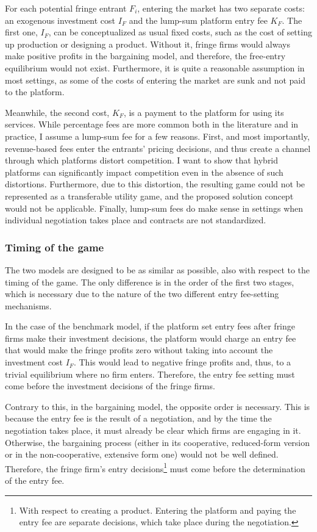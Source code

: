 For each potential fringe entrant $F_i$, entering the market has two separate costs: an exogenous investment cost $I_F$ and the lump-sum platform entry fee $K_F$.
The first one, $I_F$, can be conceptualized as usual fixed costs, such as the cost of setting up production or designing a product.
Without it, fringe firms would always make positive profits in the bargaining model, and therefore, the free-entry equilibrium would not exist.
Furthermore, it is quite a reasonable assumption in most settings, as some of the costs of entering the market are sunk and not paid to the platform.

Meanwhile, the second cost, $K_F$, is a payment to the platform for using its services.
While percentage fees are more common both in the literature and in practice, I assume a lump-sum fee for a few reasons.
First, and most importantly, revenue-based fees enter the entrants' pricing decisions, and thus create a channel through which platforms distort competition.
I want to show that hybrid platforms can significantly impact competition even in the absence of such distortions.
Furthermore, due to this distortion, the resulting game could not be represented as a transferable utility game, and the proposed solution concept would not be applicable.
Finally, lump-sum fees do make sense in settings when individual negotiation takes place and contracts are not standardized.

\subsubsection{Timing of the game}

The two models are designed to be as similar as possible, also with respect to the timing of the game.
The only difference is in the order of the first two stages, which is necessary due to the nature of the two different entry fee-setting mechanisms.

In the case of the benchmark model, if the platform set entry fees after fringe firms make their investment decisions, the platform would charge an entry fee that would make the fringe profits zero without taking into account the investment cost $I_F$.
This would lead to negative fringe profits and, thus, to a trivial equilibrium where no firm enters.
Therefore, the entry fee setting must come before the investment decisions of the fringe firms.

Contrary to this, in the bargaining model, the opposite order is necessary.
This is because the entry fee is the result of a negotiation, and by the time the negotiation takes place, it must already be clear which firms are engaging in it.
Otherwise, the bargaining process (either in its cooperative, reduced-form version or in the non-cooperative, extensive form one) would not be well defined.
Therefore, the fringe firm's entry decisions\footnote{
    With respect to creating a product.
    Entering the platform and paying the entry fee are separate decisions, which take place during the negotiation.
} must come before the determination of the entry fee.

